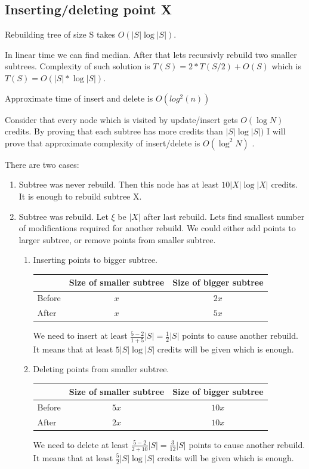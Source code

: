 \documentclass{llncs}
\newcommand{\<}{\langle}
\renewcommand{\>}{\rangle}
\begin{document}
\subsection{Inserting/deleting point X}
\begin{lemma}\label{lem:1}
Rebuilding tree of size S takes $O(|S| \log |S|)$.
\end{lemma}

In linear time we can find median. After that lets recursivly rebuild two smaller subtrees. Complexity of such solution is $T(S) = 2 * T(S/2) + O(S)$ which is $T(S) = O(|S| * \log |S|).$

\begin{lemma}\label{lem:2}
Approximate time of insert and delete is $O(log^2 (n))$
\end{lemma}

Consider that every node which is visited by update/insert gets $O(\log N)$ credits. By proving that each subtree has more credits than $|S| \log |S|)$ I will prove that approximate complexity of insert/delete is $O(\log^2{N})$ .

There are two cases:
\begin{enumerate}
\item Subtree was never rebuild. Then this node has at least $10 |X| \log |X|$ credits. It is enough to rebuild subtree X.
\item Subtree was rebuild. Let $\xi$ be $|X|$ after last rebuild. Lets find smallest number of modifications required for another rebuild. We could either add points to larger subtree, or remove points from smaller subtree.
\begin{enumerate}
\item Inserting points to bigger subtree.

\begin{tabular}{|l|c|c|}
\hline  & Size of smaller subtree & Size of bigger subtree  \\
\hline Before & $x$ & $2x$ \\
\hline After & $x$ & $5x$ \\
\hline 
\end{tabular}

We need to insert at least $ \frac{5 - 2}{1 + 5} |S| = \frac{1}{2} |S|$ points to cause another rebuild. It means that at least $5 |S| \log |S|$ credits will be given which is enough. 

\bigskip
\item Deleting points from smaller subtree.

\begin{tabular}{|l|c|c|}
\hline  & Size of smaller subtree & Size of bigger subtree  \\
\hline Before & $5x$ & $10x$ \\
\hline After & $2x$ & $10x$ \\
\hline 
\end{tabular}

We need to delete at least $\frac{5 - 2}{2 + 10} |S| = \frac{3}{12} |S|$ points to cause another rebuild. It means that at least $\frac{5}{2} |S| \log |S|$ credits will be given which is enough. 

\end{enumerate}
\end{enumerate}
\end{document}
